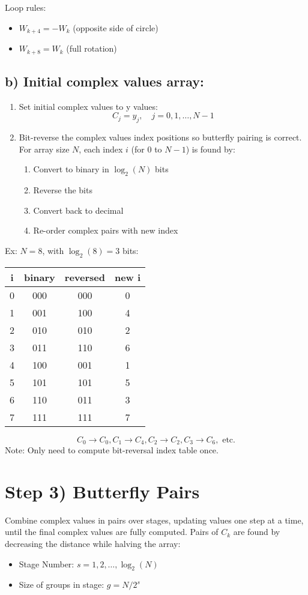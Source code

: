 \documentclass[12pt]{article}
\begin{document}
Loop rules:
\begin{itemize}
    \item $W_{k+4} = -W_k$ (opposite side of circle)
    \item $W_{k+8} = W_k$ (full rotation)
\end{itemize}

\subsection*{b) Initial complex values array:}
\begin{enumerate}[label=\roman*)]
    \item Set initial complex values to y values:
    \[C_j = y_j, \quad j=0,1,\ldots,N-1\]
    \item Bit-reverse the complex values index positions so butterfly pairing is correct.\\
    For array size $N$, each index $i$ (for 0 to $N-1$) is found by:
    \begin{enumerate}
        \item Convert to binary in $\log_2(N)$ bits
        \item Reverse the bits
        \item Convert back to decimal
        \item Re-order complex pairs with new index
    \end{enumerate}
\end{enumerate}

Ex: $N=8$, with $\log_2(8)=3$ bits:
\begin{center}
\begin{tabular}{|c|c|c|c|}
\hline
i & binary & reversed & new i\\
\hline
0 & 000 & 000 & 0\\
1 & 001 & 100 & 4\\
2 & 010 & 010 & 2\\
3 & 011 & 110 & 6\\
4 & 100 & 001 & 1\\
5 & 101 & 101 & 5\\
6 & 110 & 011 & 3\\
7 & 111 & 111 & 7\\
\hline
\end{tabular}
\end{center}

\[C_0 \to C_0, C_1 \to C_4, C_2 \to C_2, C_3 \to C_6, \text{ etc.}\]
Note: Only need to compute bit-reversal index table once.

\section*{Step 3) Butterfly Pairs}
Combine complex values in pairs over stages, updating values one step at a time, until the final complex values are fully computed. Pairs of $C_k$ are found by decreasing the distance while halving the array:
\begin{itemize}
    \item Stage Number: $s = 1,2,\ldots,\log_2(N)$
    \item Size of groups in stage: $g = N/2^s$
\end{itemize}
\end{document}
